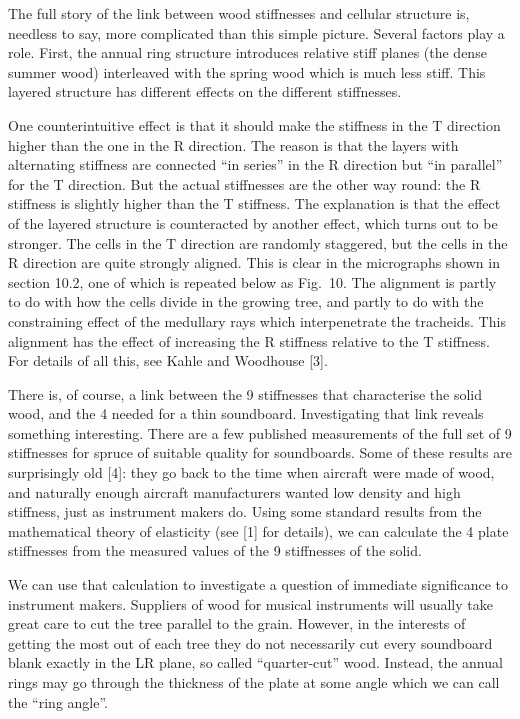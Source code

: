   The full story of the link between wood stiffnesses and cellular structure 
  is, needless to say, more complicated than this simple picture. Several 
  factors play a role. First, the annual ring structure introduces relative 
  stiff planes (the dense summer wood) interleaved with the spring wood which 
  is much less stiff. This layered structure has different effects on the 
  different stiffnesses. 

  One counterintuitive effect is that it should make the stiffness in the T 
  direction higher than the one in the R direction. The reason is that the 
  layers with alternating stiffness are connected ``in series'' in the R 
  direction but ``in parallel'' for the T direction. But the actual stiffnesses 
  are the other way round: the R stiffness is slightly higher than the T 
  stiffness. The explanation is that the effect of the layered structure is 
  counteracted by another effect, which turns out to be stronger. The cells in 
  the T direction are randomly staggered, but the cells in the R direction are 
  quite strongly aligned. This is clear in the micrographs shown in section 
  10.2, one of which is repeated below as Fig.\ 10. The alignment is partly to 
  do with how the cells divide in the growing tree, and partly to do with the 
  constraining effect of the medullary rays which interpenetrate the tracheids. 
  This alignment has the effect of increasing the R stiffness relative to the T 
  stiffness. For details of all this, see Kahle and Woodhouse [3]. 

  There is, of course, a link between the 9 stiffnesses that characterise the 
  solid wood, and the 4 needed for a thin soundboard. Investigating that link 
  reveals something interesting. There are a few published measurements of the 
  full set of 9 stiffnesses for spruce of suitable quality for soundboards. 
  Some of these results are surprisingly old [4]: they go back to the time when 
  aircraft were made of wood, and naturally enough aircraft manufacturers 
  wanted low density and high stiffness, just as instrument makers do. Using 
  some standard results from the mathematical theory of elasticity (see [1] for 
  details), we can calculate the 4 plate stiffnesses from the measured values 
  of the 9 stiffnesses of the solid. 

  We can use that calculation to investigate a question of immediate 
  significance to instrument makers. Suppliers of wood for musical instruments 
  will usually take great care to cut the tree parallel to the grain. However, 
  in the interests of getting the most out of each tree they do not necessarily 
  cut every soundboard blank exactly in the LR plane, so called “quarter-cut” 
  wood. Instead, the annual rings may go through the thickness of the plate at 
  some angle which we can call the “ring angle”. 

